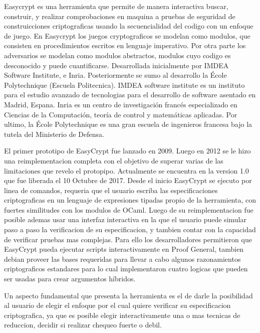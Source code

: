 \documentclass[runningheads]{llncs}
\begin{document}
Easycrypt es una herramienta que permite de manera interactiva buscar, construir, y realizar comprobaciones en maquina a pruebas de seguridad de construicciones criptograficas usando la secuencialidad del codigo con un enfoque de juego. En Easycrypt los juegos cryptograficos se modelan como modulos, que consisten en procedimientos escritos en lenguaje imperativo. Por otra parte los adversarios se modelan como modulos abstractos, modulos cuyo codigo es desconocido y puede cuantificarse. Desarrollada inicialmente por IMDEA Software Institute, e Inria. Posteriormente se sumo al desarrollo la École Polytechnique (Escuela Politecnica). IMDEA software institute es un instituto para el estudio avanzado de tecnologias para el desarrollo de software asentado en Madrid, Espana. Inria es un centro de investigación francés especializado en Ciencias de la Computación, teoría de control y matemáticas aplicadas. Por ultimo, la École Polytechnique es una gran escuela de ingenieros francesa bajo la tutela del Ministerio de Defensa.

El primer prototipo de EasyCrypt fue lanzado en 2009. Luego en 2012 se le hizo una reimplementacion completa con el objetivo de superar varias de las limitaciones que revelo el protopipo. Actualmente se encuentra en la version 1.0 que fue liberada el 10 Octubre de 2017. Desde el inicio EasyCrypt se ejecuto por linea de comandos, requeria que el usuario escriba las especificaciones criptograficas en un lenguaje de expresiones tipadas propio de la herramienta, con fuertes similitudes con los modulos de OCaml\cite{ref_webpage1}. Luego de su reimplementacion fue posible ademas usar una interfaz interactiva en la que el usuario puede simular paso a paso la verificacion de su especificacion, y tambien contar con la capacidad de verificar pruebas mas complejas. Para ello los desarrolladores permitieron que EasyCrypt pueda ejecutar scripts interactivamente en Proof General\cite{ref_webpage2}, tambien debian proveer las bases requeridas para llevar a cabo algunos razonamientos criptograficos estandares para lo cual implementaron cuatro logicas que pueden ser usadas para crear argumentos híbridos.

Un aspecto fundamental que presenta la herramienta es el de darle la posibilidad al usuario de elegir el enfoque por el cual quiere verificar su especificacion criptografica, ya que es posible elegir interactivamente una o mas tecnicas de reduccion, decidir si realizar chequeo fuerte o debil.%

\end{document}
